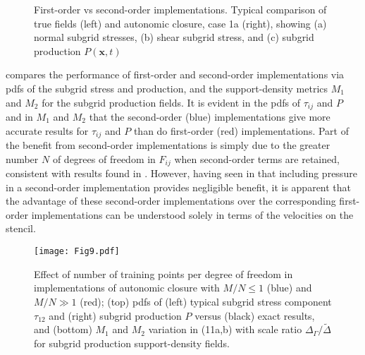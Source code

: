 %
\begin{figure}
	\centering %
	\label{F:CL14a}
\end{figure}
%
\begin{figure}
	\ContinuedFloat
	\centering %
	\label{F:CL14b}
\end{figure}
%
\begin{figure}
	\ContinuedFloat
	\centering %
	\label{F:CL14c}
\end{figure}
%
\begin{figure}
	\ContinuedFloat
	\caption{First-order vs second-order implementations. Typical comparison of  true fields (left) and autonomic closure, case 1a (right), showing (a) normal subgrid stresses, (b) shear subgrid stress, and (c) subgrid production $P(\mathbf{x},t)$}
	\label{F:CL14}
\end{figure}
%
%

 compares the performance of first-order and second-order implementations via pdfs of the subgrid stress and production, and the support-density metrics  $M_1$ and $M_2$ for the subgrid production fields. It is evident in the pdfs of  $\tau_{ij}$ and $P$ and in $M_1$   and $M_2$  that the second-order (blue) implementations give more accurate results for  $\tau_{ij}$ and $P$ than do first-order (red) implementations. Part of the benefit from second-order implementations is simply due to the greater number $N$ of degrees of freedom in  $F_{ij}$ when second-order terms are retained, consistent with results found in . However, having seen in   that including pressure in a second-order implementation provides negligible benefit, it is apparent that the advantage of these second-order implementations over the corresponding first-order implementations can be understood solely in terms of the velocities on the stencil. 

%
\begin{figure}
	\begin{center}
	\texttt{[image: Fig9.pdf]}
	\caption{Effect of number of training points per degree of freedom in implementations of autonomic closure with $M/N \leq 1$ (blue) and $M/N \gg 1$  (red); (top) pdfs of (left) typical subgrid stress component $\tau_{12}$ and (right) subgrid production $P$ versus (black) exact results, and (bottom) $M_1$ and $M_2$ variation in (11a,b) with scale ratio $\Delta_{\Gamma}/\widetilde{\Delta}$ for subgrid production support-density fields.}
	\label{F:9}
	\end{center}
\end{figure}
%
%

